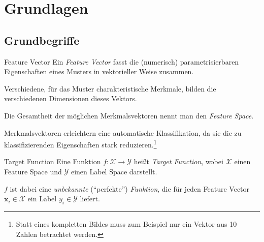 \section{Grundlagen}

\subsection{Grundbegriffe}

\begin{defi}{Feature Vector}
    Ein \emph{Feature Vector} fasst die (numerisch) parametrisierbaren Eigenschaften eines Musters in vektorieller Weise zusammen.

    Verschiedene, für das Muster charakteristische Merkmale, bilden die verschiedenen Dimensionen dieses Vektors.

    Die Gesamtheit der möglichen Merkmalsvektoren nennt man den \emph{Feature Space}.

    Merkmalsvektoren erleichtern eine automatische Klassifikation, da sie die zu klassifizierenden Eigenschaften stark reduzieren.\footnote{Statt eines kompletten Bildes muss zum Beispiel nur ein Vektor aus 10 Zahlen betrachtet werden.}
\end{defi}

\begin{defi}{Target Function}
    Eine Funktion $f: \mathcal{X} \to \mathcal{Y}$ heißt \emph{Target Function}, wobei $\mathcal{X}$ einen Feature Space und $\mathcal{Y}$ einen Label Space darstellt.

    $f$ ist dabei eine \emph{unbekannte} (\enquote{perfekte}) \emph{Funktion}, die für jeden Feature Vector $\mathbf{x}_i \in \mathcal{X}$ ein Label $y_i \in \mathcal{Y}$ liefert.
\end{defi}

